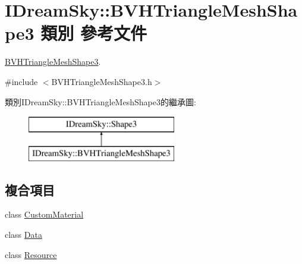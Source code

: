 \hypertarget{class_i_dream_sky_1_1_b_v_h_triangle_mesh_shape3}{}\section{I\+Dream\+Sky\+:\+:B\+V\+H\+Triangle\+Mesh\+Shape3 類別 參考文件}
\label{class_i_dream_sky_1_1_b_v_h_triangle_mesh_shape3}


\hyperlink{class_i_dream_sky_1_1_b_v_h_triangle_mesh_shape3}{B\+V\+H\+Triangle\+Mesh\+Shape3}.  




{\ttfamily \#include $<$B\+V\+H\+Triangle\+Mesh\+Shape3.\+h$>$}

類別\+I\+Dream\+Sky\+:\+:B\+V\+H\+Triangle\+Mesh\+Shape3的繼承圖\+:\begin{figure}[H]
\begin{center}
\leavevmode
\includegraphics[height=2.000000cm]{class_i_dream_sky_1_1_b_v_h_triangle_mesh_shape3}
\end{center}
\end{figure}
\subsection*{複合項目}
\begin{DoxyCompactItemize}
\item 
class \hyperlink{class_i_dream_sky_1_1_b_v_h_triangle_mesh_shape3_1_1_custom_material}{Custom\+Material}
\item 
class \hyperlink{class_i_dream_sky_1_1_b_v_h_triangle_mesh_shape3_1_1_data}{Data}
\item 
class \hyperlink{class_i_dream_sky_1_1_b_v_h_triangle_mesh_shape3_1_1_resource}{Resource}
\end{DoxyCompactItemize}
